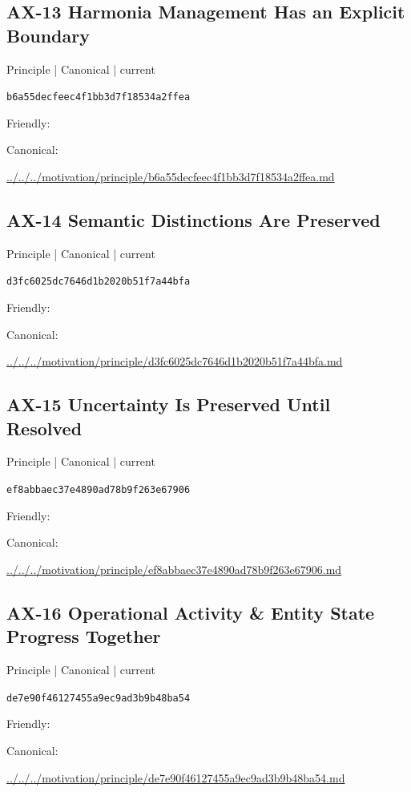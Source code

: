 \documentclass[10pt,a4paper]{article}
\begin{document}
\subsection*{AX-13 Harmonia Management Has an Explicit Boundary}
{\small Principle | Canonical | current}\par
\texttt{b6a55decfeec4f1bb3d7f18534a2ffea}\par
Friendly: \par
Canonical: \par
{\footnotesize\url{../../../motivation/principle/b6a55decfeec4f1bb3d7f18534a2ffea.md}}\par
\subsection*{AX-14 Semantic Distinctions Are Preserved}
{\small Principle | Canonical | current}\par
\texttt{d3fc6025dc7646d1b2020b51f7a44bfa}\par
Friendly: \par
Canonical: \par
{\footnotesize\url{../../../motivation/principle/d3fc6025dc7646d1b2020b51f7a44bfa.md}}\par
\subsection*{AX-15 Uncertainty Is Preserved Until Resolved}
{\small Principle | Canonical | current}\par
\texttt{ef8abbaec37e4890ad78b9f263e67906}\par
Friendly: \par
Canonical: \par
{\footnotesize\url{../../../motivation/principle/ef8abbaec37e4890ad78b9f263e67906.md}}\par
\subsection*{AX-16 Operational Activity \& Entity State Progress Together}
{\small Principle | Canonical | current}\par
\texttt{de7e90f46127455a9ec9ad3b9b48ba54}\par
Friendly: \par
Canonical: \par
{\footnotesize\url{../../../motivation/principle/de7e90f46127455a9ec9ad3b9b48ba54.md}}\par
\end{document}
